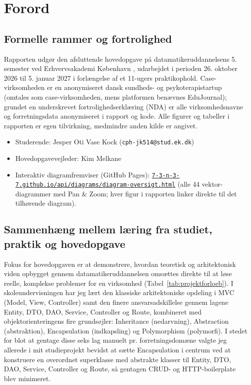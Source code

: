 \documentclass[11pt,a4paper]{article}
\newcommand{\diagramviewerurl}{https://7-3-n-3-7.github.io/api/diagrams/diagram-oversigt.html}
\begin{document}
\section{Forord}

\subsection{Formelle rammer og fortrolighed}
Rapporten udgør den afsluttende hovedopgave på datamatikeruddannelsens 5. semester ved Erhvervsakademi København \cite{ek_studieordning2024}, udarbejdet i perioden 26. oktober 2026 til 5. januar 2027 i forlængelse af et 11-ugers praktikophold. Case-virksomheden er en anonymiseret dansk sundheds- og psykoterapistartup (omtales som case-virksomheden, mens platformen benævnes EduJournal); grundet en underskrevet fortrolighedserklæring (NDA) er alle virksomhedsnavne og forretningsdata anonymiseret i rapport og kode. Alle figurer og tabeller i rapporten er egen tilvirkning, medmindre anden kilde er angivet.
\begin{itemize}[noitemsep]
    \item Studerende: Jesper Oti Vase Kock (\texttt{cph-jk514@stud.ek.dk})
    \item Hovedopgavevejleder: Kim Melkane
    \item Interaktiv diagramfremviser (GitHub Pages):\newline
    \href{\diagramviewerurl}{\nolinkurl{7-3-n-3-7.github.io/api/diagrams/diagram-oversigt.html}}\newline
    (alle 44 vektor-diagrammer med Pan \& Zoom; hver figur i rapporten linker direkte til det tilhørende diagram).
\end{itemize}

\subsection{Sammenhæng mellem læring fra studiet, praktik og hovedopgave}
Fokus for hovedopgaven er at demonstrere, hvordan teoretisk og arkitektonisk viden opbygget gennem datamatikeruddannelsen omsættes direkte til at løse reelle, komplekse problemer for en virksomhed (Tabel~\ref{tab:projektforloeb}). I skoleundervisningen har jeg lært den klassiske arkitektoniske opdeling i MVC (Model, View, Controller) samt den finere ansvarsadskillelse gennem lagene Entity, DTO, DAO, Service, Controller og Route, kombineret med objektorienteringens fire grundsøjler: Inheritance (nedarvning), Abstraction (abstraktion), Encapsulation (indkapsling) og Polymorphism (polymorfi). I stedet for blot at gentage disse seks lag manuelt pr. forretningsdomæne valgte jeg allerede i mit studieprojekt bevidst at sætte Encapsulation i centrum ved at konstruere en overordnet superklasse med abstrakte klasser til Entity, DTO, DAO, Service, Controller og Route, så gentagen CRUD- og HTTP-boilerplate blev minimeret.
\end{document}
